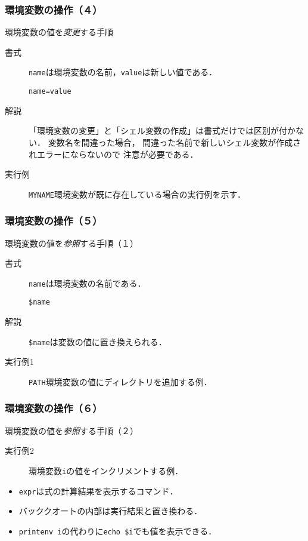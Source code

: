 \documentclass{beamer}                 %
\begin{document}
\begin{frame}[fragile]
  \frametitle{環境変数の操作（４）}
  環境変数の値を\emph{変更}する手順
\begin{description}
\item [書式]
  \texttt{name}は環境変数の名前，\texttt{value}は新しい値である．
\begin{lstlisting}[numbers=none]
  name=value
\end{lstlisting}
\item [解説]
  「環境変数の変更」と「シェル変数の作成」は書式だけでは区別が付かない．
  変数名を間違った場合，
  間違った名前で新しいシェル変数が作成されエラーにならないので
  注意が必要である．
\item [実行例]
  \texttt{MYNAME}環境変数が既に存在している場合の実行例を示す．
\end{description}
\end{frame}

\begin{frame}[fragile]
  \frametitle{環境変数の操作（５）}
  環境変数の値を\emph{参照}する手順（１）
\begin{description}
\item [書式]
  \texttt{name}は環境変数の名前である．
\begin{lstlisting}[numbers=none]
  $name
\end{lstlisting} %
\item [解説]
  \texttt{\$name}は変数の値に置き換えられる．
\item [実行例1]
  \texttt{PATH}環境変数の値にディレクトリを追加する例．
\end{description}
\end{frame}

\begin{frame}[fragile]
  \frametitle{環境変数の操作（６）}
  環境変数の値を\emph{参照}する手順（２）
\begin{description}
\item [実行例2]
  環境変数\texttt{i}の値をインクリメントする例．\\
\end{description}
  \begin{itemize}
    \item  \texttt{expr}は式の計算結果を表示するコマンド．
    \item バッククオートの内部は実行結果と置き換わる．
    \item  \texttt{printenv i}の代わりに\texttt{echo \$i}でも値を表示できる．
  \end{itemize}
\end{frame}
\end{document}
